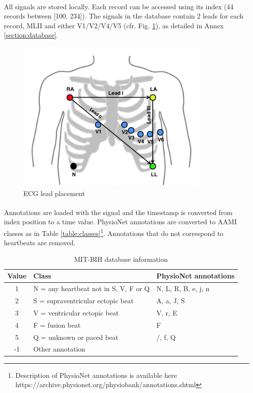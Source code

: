 \documentclass[a4paper,10pt,twoside]{article}
\begin{document}
\paragraph{}All signals are stored locally. Each record can be accessed using its index (44 records between [100, 234]). The signals in the database contain 2 leads for each record, MLII and either V1/V2/V4/V5 (cfr. Fig. \ref{fig:lead}), as detailed in Annex \ref{section:database}. 

\begin{figure}[!h]
\centering
\includegraphics[scale=1]{lead.PNG}
\caption{ECG lead placement}
\label{fig:lead}
\end{figure}

\paragraph{} Annotations are loaded with the signal and the timestamp is converted from index position to a time value. PhysioNet annotations are converted to AAMI classes as in Table \ref{table:classes}\footnote{Description of PhysioNet annotations is available here https://archive.physionet.org/physiobank/annotations.shtml}. Annotations that do not correspond to heartbeats are removed. 

\begin{table}[h!]
\centering
\caption{MIT-BIH database information}
\label{table:database}
 \begin{tabular}{c|l|l} 
 \hline
 Value & Class & PhysioNet annotations \\
 \hline
 1 & N = any heartbeat not in S, V, F or Q & N, L, R, B, e, j, n\\
 2 & S = supraventricular ectopic beat & A, a, J, S\\
 3 & V = ventricular ectopic beat& V, r, E \\
 4 & F = fusion beat& F\\
 5 & Q = unknown or paced beat& /, f, Q\\
 -1 & Other annotation & \\
 \hline
 \end{tabular}
\end{table}
\end{document}
